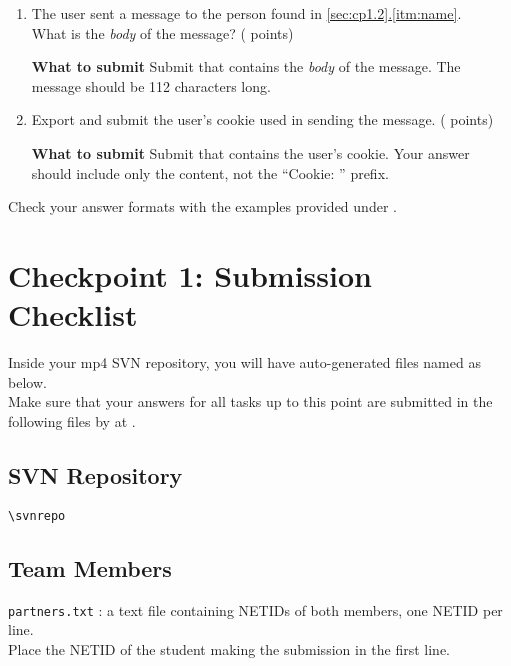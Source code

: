 \begin{enumerate}
  \item \hypertarget{cp1msg}{The user sent a message to the person found in \hyperlink{cp1name}{\ref*{sec:cp1.2}.\ref*{itm:name}}.\\
  What is the \textit{body} of the message? ( points)} \label{itm:msg}

    \textbf{What to submit}\hspace{10pt}
    Submit \texttt{\hyperlink{msgformat}{\filemsg}} that contains the \textit{body} of the message.
    The message should be 112 characters long.

  \item \hypertarget{cp1cookie}{Export and submit the user's cookie used in sending the message. ( points)} \label{itm:cookie}

    \textbf{What to submit}\hspace{10pt}
    Submit \texttt{\hyperlink{cookieformat}{\filecookie}} that contains the user's cookie.
    Your answer should include only the content, not the ``Cookie: '' prefix.

\end{enumerate}

Check your answer formats with the examples provided under \textit{}.

\newpage

\section*{Checkpoint 1: Submission Checklist}
\label{sec:cp1checklist}

Inside your mp4 SVN repository, you will have auto-generated files named as below.\\
Make sure that your answers for all tasks up to this point are submitted in the following files by \textbf{\checkpointduedate} at \textbf{\duetime}.

\subsection*{SVN Repository}
\nolinkurl{\svnrepo}

\subsection*{Team Members}
\texttt{partners.txt} : a text file containing NETIDs of both members, one NETID per line.\\
Place the NETID of the student making the submission in the first line.
\vspace{-12pt}
\hypertarget{cp1partners}{}
